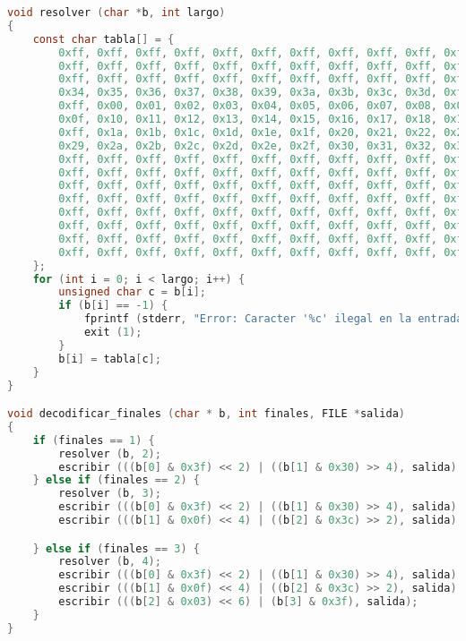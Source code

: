 \documentclass[a4paper,11pt, margin=1in]{article}
\begin{document}
\begin{lstlisting}[language=C,breaklines=true]
void resolver (char *b, int largo)
{
	const char tabla[] = {
		0xff, 0xff, 0xff, 0xff, 0xff, 0xff, 0xff, 0xff, 0xff, 0xff, 0xff, 0xff, 0xff, 0xff, 0xff, 0xff, 
		0xff, 0xff, 0xff, 0xff, 0xff, 0xff, 0xff, 0xff, 0xff, 0xff, 0xff, 0xff, 0xff, 0xff, 0xff, 0xff, 
		0xff, 0xff, 0xff, 0xff, 0xff, 0xff, 0xff, 0xff, 0xff, 0xff, 0xff, 0x3e, 0xff, 0xff, 0xff, 0x3f, 
		0x34, 0x35, 0x36, 0x37, 0x38, 0x39, 0x3a, 0x3b, 0x3c, 0x3d, 0xff, 0xff, 0xff, 0xff, 0xff, 0xff, 
		0xff, 0x00, 0x01, 0x02, 0x03, 0x04, 0x05, 0x06, 0x07, 0x08, 0x09, 0x0a, 0x0b, 0x0c, 0x0d, 0x0e, 
		0x0f, 0x10, 0x11, 0x12, 0x13, 0x14, 0x15, 0x16, 0x17, 0x18, 0x19, 0xff, 0xff, 0xff, 0xff, 0xff, 
		0xff, 0x1a, 0x1b, 0x1c, 0x1d, 0x1e, 0x1f, 0x20, 0x21, 0x22, 0x23, 0x24, 0x25, 0x26, 0x27, 0x28, 
		0x29, 0x2a, 0x2b, 0x2c, 0x2d, 0x2e, 0x2f, 0x30, 0x31, 0x32, 0x33, 0xff, 0xff, 0xff, 0xff, 0xff, 
		0xff, 0xff, 0xff, 0xff, 0xff, 0xff, 0xff, 0xff, 0xff, 0xff, 0xff, 0xff, 0xff, 0xff, 0xff, 0xff, 
		0xff, 0xff, 0xff, 0xff, 0xff, 0xff, 0xff, 0xff, 0xff, 0xff, 0xff, 0xff, 0xff, 0xff, 0xff, 0xff, 
		0xff, 0xff, 0xff, 0xff, 0xff, 0xff, 0xff, 0xff, 0xff, 0xff, 0xff, 0xff, 0xff, 0xff, 0xff, 0xff, 
		0xff, 0xff, 0xff, 0xff, 0xff, 0xff, 0xff, 0xff, 0xff, 0xff, 0xff, 0xff, 0xff, 0xff, 0xff, 0xff, 
		0xff, 0xff, 0xff, 0xff, 0xff, 0xff, 0xff, 0xff, 0xff, 0xff, 0xff, 0xff, 0xff, 0xff, 0xff, 0xff, 
		0xff, 0xff, 0xff, 0xff, 0xff, 0xff, 0xff, 0xff, 0xff, 0xff, 0xff, 0xff, 0xff, 0xff, 0xff, 0xff, 
		0xff, 0xff, 0xff, 0xff, 0xff, 0xff, 0xff, 0xff, 0xff, 0xff, 0xff, 0xff, 0xff, 0xff, 0xff, 0xff, 
		0xff, 0xff, 0xff, 0xff, 0xff, 0xff, 0xff, 0xff, 0xff, 0xff, 0xff, 0xff, 0xff, 0xff, 0xff, 0xff
	};
	for (int i = 0; i < largo; i++) {
		unsigned char c = b[i];
		if (b[i] == -1) {
			fprintf (stderr, "Error: Caracter '%c' ilegal en la entrada\n", c);
			exit (1);
		}
		b[i] = tabla[c];
	}
}

void decodificar_finales (char * b, int finales, FILE *salida)
{
	if (finales == 1) {
		resolver (b, 2);
		escribir (((b[0] & 0x3f) << 2) | ((b[1] & 0x30) >> 4), salida);
	} else if (finales == 2) {
		resolver (b, 3);
		escribir (((b[0] & 0x3f) << 2) | ((b[1] & 0x30) >> 4), salida);
		escribir (((b[1] & 0x0f) << 4) | ((b[2] & 0x3c) >> 2), salida);

	} else if (finales == 3) {
		resolver (b, 4);
		escribir (((b[0] & 0x3f) << 2) | ((b[1] & 0x30) >> 4), salida);
		escribir (((b[1] & 0x0f) << 4) | ((b[2] & 0x3c) >> 2), salida);
		escribir (((b[2] & 0x03) << 6) | (b[3] & 0x3f), salida);
	}
}


\end{lstlisting}
\end{document}
